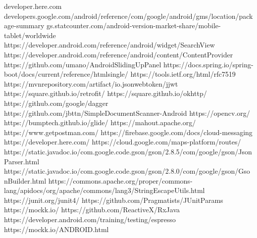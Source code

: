 \documentclass[10pt,twoside,a4paper]{report}
\begin{document}

\begin{thebibliography}{1}
   developer.here.com
   developers.google.com/android/reference/com/google/android/gms/location/package-summary
   gs.statcounter.com/android-version-market-share/mobile-tablet/worldwide
   https://developer.android.com/reference/android/widget/SearchView
   https://developer.android.com/reference/android/content/ContentProvider
   https://github.com/umano/AndroidSlidingUpPanel
   https://docs.spring.io/spring-boot/docs/current/reference/htmlsingle/
   https://tools.ietf.org/html/rfc7519
   https://mvnrepository.com/artifact/io.jsonwebtoken/jjwt
   https://square.github.io/retrofit/
   https://square.github.io/okhttp/
   https://github.com/google/dagger
   https://github.com/jbttn/SimpleDocumentScanner-Android
   https://opencv.org/
   https://bumptech.github.io/glide/
   https://mahout.apache.org/
   https://www.getpostman.com/
   https://firebase.google.com/docs/cloud-messaging
   https://developer.here.com/
   https://cloud.google.com/maps-platform/routes/
   https://static.javadoc.io/com.google.code.gson/gson/2.8.5/com/google/gson/JsonParser.html
   https://static.javadoc.io/com.google.code.gson/gson/2.8.0/com/google/gson/GsonBuilder.html
   https://commons.apache.org/proper/commons-lang/apidocs/org/apache/commons/lang3/StringEscapeUtils.html
   https://junit.org/junit4/
   https://github.com/Pragmatists/JUnitParams
   https://mockk.io/
   https://github.com/ReactiveX/RxJava
   https://developer.android.com/training/testing/espresso
   https://mockk.io/ANDROID.html
\end{thebibliography}


\listoffigures
\listoftables
\end{document}
